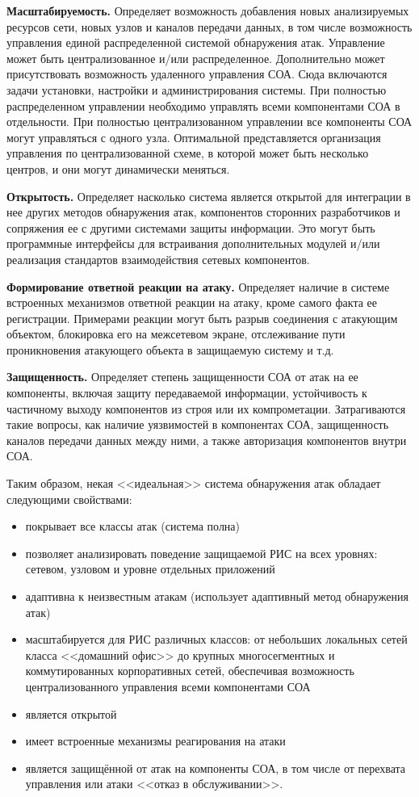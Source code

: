 \textbf{Масштабируемость.} Определяет возможность добавления новых анализируемых ресурсов сети, новых узлов и каналов передачи данных, в том числе возможность управления единой распределенной системой обнаружения атак. Управление может быть централизованное и/или распределенное. Дополнительно может присутствовать возможность удаленного управления СОА. Сюда включаются задачи установки, настройки и администрирования системы. При полностью распределенном управлении необходимо управлять всеми компонентами СОА в отдельности. При полностью централизованном управлении все компоненты СОА могут управляться с одного узла. Оптимальной представляется организация управления по централизованной схеме, в которой может быть несколько центров, и они могут динамически меняться.

\textbf{Открытость.} Определяет насколько система является открытой для интеграции в нее других методов обнаружения атак, компонентов сторонних разработчиков и сопряжения ее с другими системами защиты информации. Это могут быть программные интерфейсы для встраивания дополнительных модулей и/или реализация стандартов взаимодействия сетевых компонентов.

\textbf{Формирование ответной реакции на атаку.} Определяет наличие в системе встроенных механизмов ответной реакции на атаку, кроме самого факта ее регистрации. Примерами реакции могут быть разрыв соединения с атакующим объектом, блокировка его на межсетевом экране, отслеживание пути проникновения атакующего объекта в защищаемую систему и т.д.

\textbf{Защищенность.} Определяет степень защищенности СОА от атак на ее компоненты, включая защиту передаваемой информации, устойчивость к частичному выходу компонентов из строя или их компрометации. Затрагиваются такие вопросы, как наличие уязвимостей в компонентах СОА, защищенность каналов передачи данных между ними, а также авторизация компонентов внутри СОА.

Таким образом, некая <<идеальная>> система обнаружения атак обладает следующими свойствами:
\begin{itemize}

\item покрывает все классы атак (система полна)
\item позволяет анализировать поведение защищаемой РИС на всех уровнях: сетевом, узловом и уровне отдельных приложений
\item адаптивна к неизвестным атакам (использует адаптивный метод обнаружения атак)
\item масштабируется для РИС различных классов: от небольших локальных сетей класса <<домашний офис>> до крупных многосегментных и коммутированных корпоративных сетей, обеспечивая возможность централизованного управления всеми компонентами СОА
\item является открытой
\item имеет встроенные механизмы реагирования на атаки
\item является защищённой от атак на компоненты СОА, в том числе от перехвата управления или атаки <<отказ в обслуживании>>.

\end{itemize}

